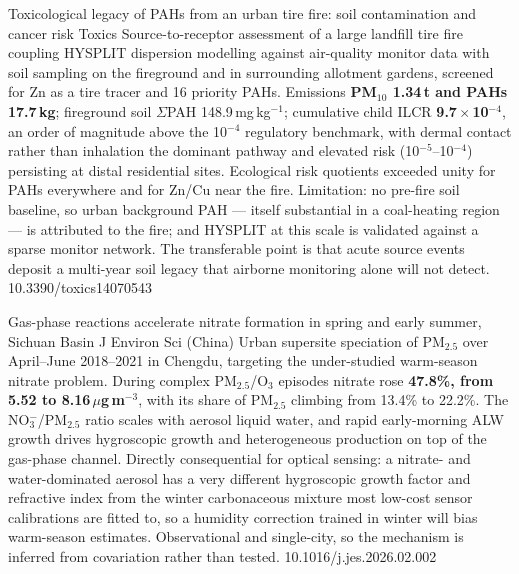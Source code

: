 \documentclass[10pt]{article}
\begin{document}
{Toxicological legacy of PAHs from an urban tire fire: soil contamination and cancer risk}
{Toxics}
{Source-to-receptor assessment of a large landfill tire fire coupling HYSPLIT dispersion
modelling against air-quality monitor data with soil sampling on the fireground and in
surrounding allotment gardens, screened for Zn as a tire tracer and 16 priority PAHs.
Emissions \textbf{PM$_{10}$ 1.34\,t and PAHs 17.7\,kg}; fireground soil
$\Sigma$PAH 148.9\,mg\,kg$^{-1}$; cumulative child ILCR \textbf{9.7\,$\times$\,10$^{-4}$},
an order of magnitude above the 10$^{-4}$ regulatory benchmark, with dermal contact rather
than inhalation the dominant pathway and elevated risk (10$^{-5}$--10$^{-4}$) persisting
at distal residential sites. Ecological risk quotients exceeded unity for PAHs everywhere
and for Zn/Cu near the fire. Limitation: no pre-fire soil baseline, so urban background
PAH --- itself substantial in a coal-heating region --- is attributed to the fire; and
HYSPLIT at this scale is validated against a sparse monitor network. The transferable
point is that acute source events deposit a multi-year soil legacy that airborne
monitoring alone will not detect.}
{10.3390/toxics14070543}

{Gas-phase reactions accelerate nitrate formation in spring and early summer, Sichuan Basin}
{J Environ Sci (China)}
{Urban supersite speciation of PM$_{2.5}$ over April--June 2018--2021 in Chengdu,
targeting the under-studied warm-season nitrate problem. During complex PM$_{2.5}$/O$_3$
episodes nitrate rose \textbf{47.8\%, from 5.52 to 8.16\,$\mu$g\,m$^{-3}$}, with its
share of PM$_{2.5}$ climbing from 13.4\% to 22.2\%. The NO$_3^-$/PM$_{2.5}$ ratio scales
with aerosol liquid water, and rapid early-morning ALW growth drives hygroscopic growth
and heterogeneous production on top of the gas-phase channel. Directly consequential for
optical sensing: a nitrate- and water-dominated aerosol has a very different hygroscopic
growth factor and refractive index from the winter carbonaceous mixture most low-cost
sensor calibrations are fitted to, so a humidity correction trained in winter will bias
warm-season estimates. Observational and single-city, so the mechanism is inferred from
covariation rather than tested.}
{10.1016/j.jes.2026.02.002}

\end{document}
